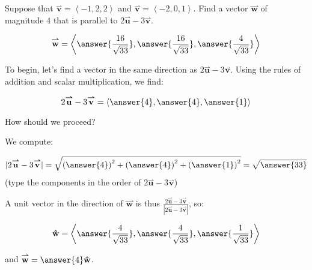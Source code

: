 \documentclass{ximera}
\author{Jim Talamo}
\begin{document}
\begin{exercise}
Suppose that $\overset{\boldsymbol{\rightharpoonup}}{\mathbf{v}} = \left\langle -1,2,2 \right\rangle$ and $\overset{\boldsymbol{\rightharpoonup}}{\mathbf{v}} = \left\langle -2,0,1 \right\rangle$.  Find a vector $\overset{\boldsymbol{\rightharpoonup}}{\mathbf{w}}$ of magnitude $4$ that is parallel to $2 \overset{\boldsymbol{\rightharpoonup}}{\mathbf{u}} - 3 \overset{\boldsymbol{\rightharpoonup}}{\mathbf{v}}$.

\[
\overset{\boldsymbol{\rightharpoonup}}{\mathbf{w}} = \left\langle \answer{\frac{16}{\sqrt{33}} }, \answer{ \frac{16}{\sqrt{33}} } , \answer{ \frac{4}{\sqrt{33}} } \right\rangle
\]

\begin{hint}
To begin, let's find a vector in the same direction as $2 \overset{\boldsymbol{\rightharpoonup}}{\mathbf{u}} - 3 \overset{\boldsymbol{\rightharpoonup}}{\mathbf{v}}$.  Using the rules of addition and scalar multiplication, we find:

\[
2 \overset{\boldsymbol{\rightharpoonup}}{\mathbf{u}} - 3 \overset{\boldsymbol{\rightharpoonup}}{\mathbf{v}} = \left\langle \answer{4} , \answer{4} , \answer{1} \right\rangle
\]

How should we proceed?

\begin{multipleChoice}
\end{multipleChoice}

We compute:

\[
|2 \overset{\boldsymbol{\rightharpoonup}}{\mathbf{u}} - 3 \overset{\boldsymbol{\rightharpoonup}}{\mathbf{v}}| = \sqrt{\left( \answer{4} \right)^2+\left(  \answer{4} \right)^2+\left(  \answer{1}\right)^2 }  = \sqrt{\answer{33}}
\]
(type the components in the order of $2 \overset{\boldsymbol{\rightharpoonup}}{\mathbf{u}} - 3 \overset{\boldsymbol{\rightharpoonup}}{\mathbf{v}}$)

A unit vector in the direction of $\overset{\boldsymbol{\rightharpoonup}}{\mathbf{w}}$ is thus $\frac{2\overset{\boldsymbol{\rightharpoonup}}{\mathbf{u}}-3\overset{\boldsymbol{\rightharpoonup}}{\mathbf{v}}}{\left|2\overset{\boldsymbol{\rightharpoonup}}{\mathbf{u}}-3\overset{\boldsymbol{\rightharpoonup}}{\mathbf{v}}\right|}$, so:

\[
\mathbf{\hat{w}} = \left\langle \answer{\frac{4}{\sqrt{33}} }, \answer{ \frac{4}{\sqrt{33}} } , \answer{ \frac{1}{\sqrt{33}} }\right\rangle
\]

and  $\overset{\boldsymbol{\rightharpoonup}}{\mathbf{w}} = \answer{4} \mathbf{\hat{w}}$.
\end{hint}

\end{exercise}
\end{document}
